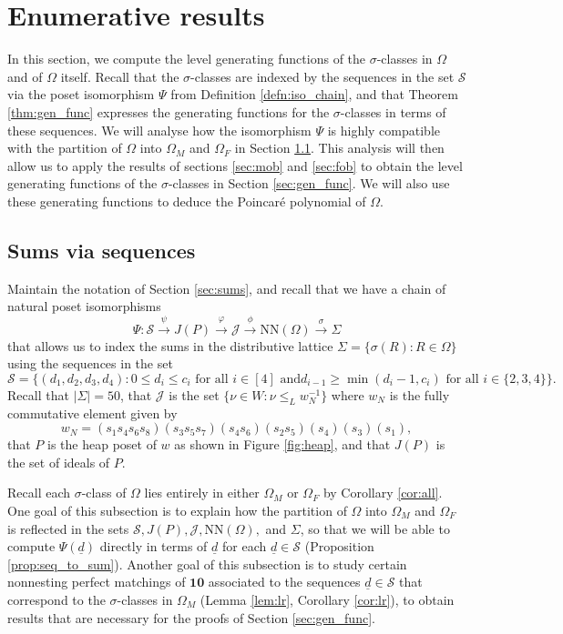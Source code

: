 \documentclass[10pt,a4paper]{amsart}
\numberwithin{equation}{section}
\newcommand{\ra}{\rightarrow}
\newcommand{\wnn}{w_{N}}
\newcommand{\seqd}{\underline{d}}
\newcommand{\calj}{\mathcal{J}}
\newcommand{\cals}{\mathcal{S}}
\newcommand{\ten}{\mathbf{10}}
\newcommand{\ob}{\Omega}
\newcommand{\fob}{\Omega_F}
\newcommand{\mob}{\Omega_M}
\newcommand{\nn}{\mathrm{NN}}
\newcommand{\inverse}{^{-1}}
\newcommand{\abs}[1]{\lvert #1 \rvert}
\begin{document}
\section{Enumerative results}
\label{sec:enum}
In this section, we compute the level generating functions of the
$\sigma$-classes in $\ob$ and of $\ob$ itself. Recall that the $\sigma$-classes
are indexed by the sequences in the set $\cals$ via the poset isomorphism $\Psi$
from Definition \ref{defn:iso_chain}, and that Theorem \ref{thm:gen_func}
expresses the generating functions for the $\sigma$-classes in terms of these
sequences. We will analyse how the isomorphism $\Psi$ is highly compatible with
the partition of $\ob$ into $\mob$ and $\fob$ in Section \ref{sec:seq_to_sum}.
This analysis will then allow us to apply the results of sections \ref{sec:mob}
and \ref{sec:fob} to obtain the level generating functions of the
$\sigma$-classes in Section \ref{sec:gen_func}. We will also use these
generating functions to deduce the Poincar\'e polynomial of $\ob$.

\subsection{Sums via sequences}
\label{sec:seq_to_sum}
Maintain the notation of Section \ref{sec:sums}, and recall that we 
have a chain of
natural poset isomorphisms
\begin{equation*}
  \Psi:
 \cals\stackrel{\psi}{\ra} J(P) \stackrel{\varphi}{\ra} \calj
  \stackrel{\phi}{\ra} \nn(\ob)\stackrel{\sigma}{\ra} \Sigma
\end{equation*}
that allows us to index the sums in the distributive lattice
$\Sigma=\{\sigma(R):R\in \ob\}$ using the
sequences in the set 
\[
\cals=\{(d_1,d_2,d_3,d_4): 0 \le d_i\le c_i \text{ for all $i\in [4]$ and
$d_{i-1}\ge \min(d_i-1,c_i)$ for all $i\in \{2,3,4\}$}\}.
\]
Recall that $\abs{\Sigma}=50$, that $\calj$ is the set $\{\nu\in W:\nu\le_L
\wnn\inverse\}$ where $\wnn$ is
the fully commutative element given by 
\[
    \wnn=(s_1s_4s_6s_8)(s_3s_5s_7)(s_4s_6)(s_2s_5)(s_4)(s_3)(s_1), 
\]
that $P$ is the heap poset of $w$ as shown in Figure \ref{fig:heap}, and that
$J(P)$ is the set of ideals of $P$. 

Recall each $\sigma$-class of $\ob$ lies entirely in either $\mob$ or $\fob$ by
Corollary \ref{cor:all}. One goal of this subsection is to explain how the
partition of $\ob$ into $\mob$ and $\fob$ is reflected in the sets $\cals, J(P),
\calj, \nn(\ob),$ and $\Sigma$, so that we will be able to compute $\Psi(\seqd)$
directly in terms of $\seqd$ for each $\seqd\in \cals$ (Proposition
\ref{prop:seq_to_sum}). Another goal of this subsection is to study certain
nonnesting perfect matchings of $\ten$ associated to the sequences $\seqd\in \cals$
that correspond to the $\sigma$-classes in $\mob$ (Lemma \ref{lem:lr}, Corollary
\ref{cor:lr}), to obtain results that are necessary for the proofs of Section
\ref{sec:gen_func}. 
\end{document}
